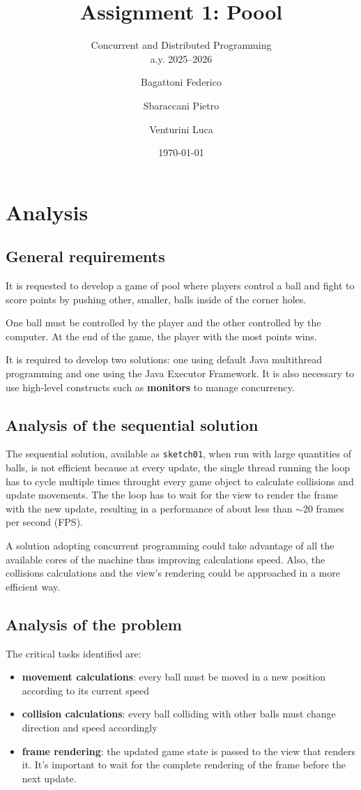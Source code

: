 \documentclass{scrartcl}
\title{\LARGE
  Assignment 1: Poool
}
\subtitle{Concurrent and Distributed Programming\\a.y. 2025--2026}
\author{
    Bagattoni Federico \and Sbaraccani Pietro \and Venturini Luca
}
\date{\today}
\begin{document}
\maketitle

\section{Analysis}
\subsection{General requirements}
It is requested to develop a game of pool where players control a ball and fight to
score points by pushing other, smaller, balls inside of the corner holes. 

One ball must be controlled by the player and the other controlled by the computer. At the
end of the game, the player with the most points wins.

It is required to develop two solutions: one using default Java multithread programming
and one using the Java Executor Framework. It is also necessary to use high-level constructs
such as \textbf{monitors} to manage concurrency.

\subsection{Analysis of the sequential solution}\label{sec:analysis-solution}
The sequential solution, available as \texttt{sketch01}, when run with large
quantities of balls, is not efficient because at every update,
the single thread running the loop has to cycle multiple times throught every
game object to calculate collisions and update movements.
The the loop has to wait for the view to render the frame with the new update,
resulting in a performance of about less than $\sim$20 frames per second (FPS).

A solution adopting concurrent programming could take advantage of all
the available cores of the machine thus improving calculations speed.
Also, the collisions calculations and the view's rendering could be 
approached in a more efficient way.
\subsection{Analysis of the problem}\label{analysis:prob}
The critical tasks identified are:
\begin{itemize}
    \item \textbf{movement calculations}: every ball must be moved in a new position according
        to its current speed
    \item \textbf{collision calculations}: every ball colliding with other balls must change
        direction and speed accordingly
    \item \textbf{frame rendering}: the updated game state is passed to the view that renders it.
        It's important to wait for the complete rendering of the frame before the next update.
\end{itemize}
\end{document}
